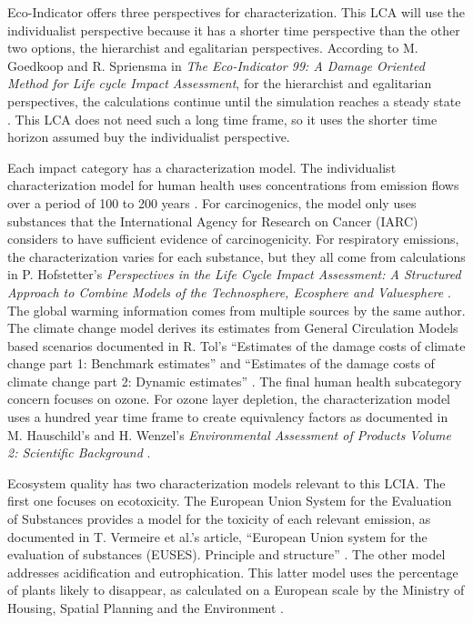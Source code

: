 \documentclass[final,journal,10pt,letterpaper,oneside,twocolumn,compsoc]%
{IEEEtran}
\begin{document}
Eco-Indicator offers three perspectives for characterization. This LCA will use
the individualist perspective because it has a shorter time
perspective than the other two options, the hierarchist and egalitarian
perspectives. According to M. Goedkoop and R. Spriensma in
\textit{The Eco-Indicator 99: A Damage Oriented Method for Life cycle Impact
Assessment}, for the hierarchist and egalitarian
perspectives, the calculations continue until the simulation reaches a steady
state \cite{pre-annex}. This LCA does not need such a long time frame, so it
uses the shorter time horizon assumed buy the individualist perspective.

Each impact category has a characterization model. The individualist
characterization model for human health uses concentrations from emission flows
over a period of 100 to 200 years \cite{pre-annex}. For carcinogenics, the model
only uses
substances that the International Agency for Research on Cancer (IARC) considers
to have sufficient evidence of carcinogenicity. For respiratory emissions, the
characterization varies for each substance, but they all come from calculations
in P. Hofstetter's
\textit{Perspectives in the Life Cycle Impact Assessment: A Structured Approach
to Combine Models of the Technosphere, Ecosphere and Valuesphere} \cite{lcia}.
The global warming information comes from multiple sources by the same author.
The climate change model derives its estimates from General
Circulation Models based scenarios documented in R. Tol's
``Estimates of the damage costs of climate change part 1: Benchmark estimates''
and ``Estimates of the damage costs of climate change part 2: Dynamic
estimates'' \cite{climate1}
\cite{climate2}. The final human health subcategory concern focuses on ozone.
For ozone
layer depletion, the characterization model uses a
hundred year time frame to create equivalency factors as documented in
M. Hauschild's and H. Wenzel's \textit{Environmental Assessment of Products
Volume 2: Scientific Background} \cite{ozone}.

Ecosystem quality has two characterization models relevant to this LCIA. The
first one focuses on ecotoxicity. The European Union System for the Evaluation
of Substances provides a model for the toxicity of each relevant emission, as
documented in T. Vermeire et al.'s article, ``European Union system for the
evaluation of substances (EUSES). Principle and structure''
\cite{euses}. The other model addresses acidification and eutrophication. This
latter model uses the percentage of plants likely to disappear, as calculated on
a
European scale by the Ministry of Housing, Spatial Planning and the Environment
\cite{pre}.
\end{document}
